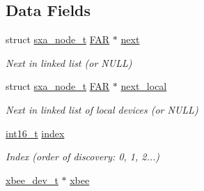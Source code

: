 \subsection*{Data Fields}
\begin{DoxyCompactItemize}
\item 
\hypertarget{structsxa__node__t_a10a0382c260b61c11040f1ea8853abd5}{struct \hyperlink{structsxa__node__t}{sxa\-\_\-node\-\_\-t} \hyperlink{group__hal_gaef060b3456fdcc093a7210a762d5f2ed}{F\-A\-R} $\ast$ \hyperlink{structsxa__node__t_a10a0382c260b61c11040f1ea8853abd5}{next}}\label{structsxa__node__t_a10a0382c260b61c11040f1ea8853abd5}

\begin{DoxyCompactList}\small\item\em Next in linked list (or N\-U\-L\-L) \end{DoxyCompactList}\item 
\hypertarget{structsxa__node__t_aba67917f7787a4106c8c066621db9bea}{struct \hyperlink{structsxa__node__t}{sxa\-\_\-node\-\_\-t} \hyperlink{group__hal_gaef060b3456fdcc093a7210a762d5f2ed}{F\-A\-R} $\ast$ \hyperlink{structsxa__node__t_aba67917f7787a4106c8c066621db9bea}{next\-\_\-local}}\label{structsxa__node__t_aba67917f7787a4106c8c066621db9bea}

\begin{DoxyCompactList}\small\item\em Next in linked list of local devices (or N\-U\-L\-L) \end{DoxyCompactList}\item 
\hypertarget{structsxa__node__t_a8411ba20cacdddb520e6c1358291c9ba}{\hyperlink{group__hal_ga2140805d08462d474b82ddc8d1c2f3e6}{int16\-\_\-t} \hyperlink{structsxa__node__t_a8411ba20cacdddb520e6c1358291c9ba}{index}}\label{structsxa__node__t_a8411ba20cacdddb520e6c1358291c9ba}

\begin{DoxyCompactList}\small\item\em Index (order of discovery\-: 0, 1, 2...) \end{DoxyCompactList}\item 
\hypertarget{structsxa__node__t_a79f0c368a2efd172b3779a2ef3a26706}{\hyperlink{structxbee__dev__t}{xbee\-\_\-dev\-\_\-t} $\ast$ \hyperlink{structsxa__node__t_a79f0c368a2efd172b3779a2ef3a26706}{xbee}}\label{structsxa__node__t_a79f0c368a2efd172b3779a2ef3a26706}


\end{DoxyCompactItemize}

